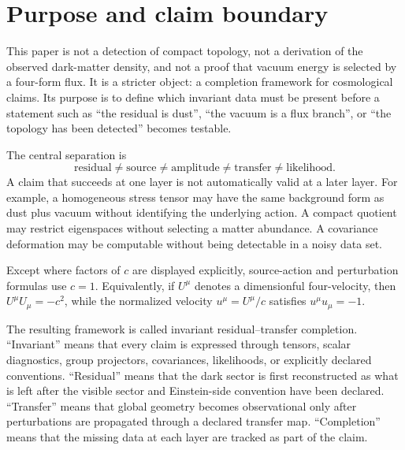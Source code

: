 \documentclass[
  aps,
  prd,
  reprint,
  superscriptaddress,
  floatfix,
  nofootinbib,
  longbibliography
]{revtex4-2}
\theoremstyle{plain}
\theoremstyle{definition}
\theoremstyle{remark}
\begin{document}
\maketitle

\section{Purpose and claim boundary}

This paper is not a detection of compact topology, not a derivation of the observed dark-matter density, and not a proof that vacuum energy is selected by a four-form flux.  It is a stricter object: a completion framework for cosmological claims.  Its purpose is to define which invariant data must be present before a statement such as ``the residual is dust'', ``the vacuum is a flux branch'', or ``the topology has been detected'' becomes testable.

The central separation is
\begin{equation}
\boxed{
\text{residual}\neq\text{source}\neq\text{amplitude}
\neq\text{transfer}\neq\text{likelihood}.}
\label{eq:category_separation}
\end{equation}
A claim that succeeds at one layer is not automatically valid at a later layer.  For example, a homogeneous stress tensor may have the same background form as dust plus vacuum without identifying the underlying action.  A compact quotient may restrict eigenspaces without selecting a matter abundance.  A covariance deformation may be computable without being detectable in a noisy data set.

Except where factors of $c$ are displayed explicitly, source-action and perturbation formulas use $c=1$. Equivalently, if $U^\mu$ denotes a dimensionful four-velocity, then $U^\mu U_\mu=-c^2$, while the normalized velocity $u^\mu=U^\mu/c$ satisfies $u^\mu u_\mu=-1$.

The resulting framework is called invariant residual--transfer completion.  ``Invariant'' means that every claim is expressed through tensors, scalar diagnostics, group projectors, covariances, likelihoods, or explicitly declared conventions.  ``Residual'' means that the dark sector is first reconstructed as what is left after the visible sector and Einstein-side convention have been declared.  ``Transfer'' means that global geometry becomes observational only after perturbations are propagated through a declared transfer map.  ``Completion'' means that the missing data at each layer are tracked as part of the claim.
\end{document}
